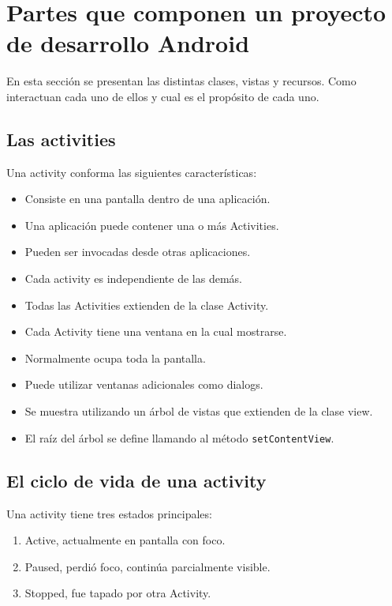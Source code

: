 \section{Partes que componen un proyecto de desarrollo Android}
\label{sec:dev.components}

En esta secci\'on se presentan las distintas clases, vistas y recursos. Como interactuan cada uno de ellos y cual es el prop\'osito de cada uno.

\subsection{Las activities}
\label{subsec:dev.activities}

Una activity conforma las siguientes caracter\'isticas:

\begin{itemize}
\item Consiste en una pantalla dentro de una aplicaci\'on.
\item Una aplicaci\'on puede contener una o m\'as Activities.
\item Pueden ser invocadas desde otras aplicaciones.
\item Cada activity es independiente de las dem\'as.
\item Todas las Activities extienden de la clase Activity.
\item Cada Activity tiene una ventana en la cual mostrarse.
\item Normalmente ocupa toda la pantalla.
\item Puede utilizar ventanas adicionales como dialogs.
\item Se muestra utilizando un \'arbol de vistas que extienden de la clase view.
\item El ra\'iz del \'arbol se define llamando al m\'etodo \texttt{setContentView}.
\end{itemize}

\subsection{El ciclo de vida de una activity}
\label{subsec:dev.activity.lifecycle}

Una activity tiene tres estados principales:

\begin{enumerate}
\item Active, actualmente en pantalla con foco.
\item Paused, perdi\'o foco, contin\'ua parcialmente visible.
\item Stopped, fue tapado por otra Activity.
\end{enumerate}

